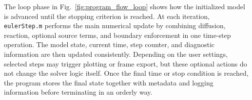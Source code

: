 The loop phase in Fig.~\ref{fig:program_flow_loop} shows how the initialized model is advanced until the stopping criterion is reached. At each iteration, \texttt{eulerStep.m} performs the main numerical update by combining diffusion, reaction, optional source terms, and boundary enforcement in one time-step operation. The model state, current time, step counter, and diagnostic information are then updated consistently. Depending on the user settings, selected steps may trigger plotting or frame export, but these optional actions do not change the solver logic itself. Once the final time or stop condition is reached, the program stores the final state together with metadata and logging information before terminating in an orderly way.